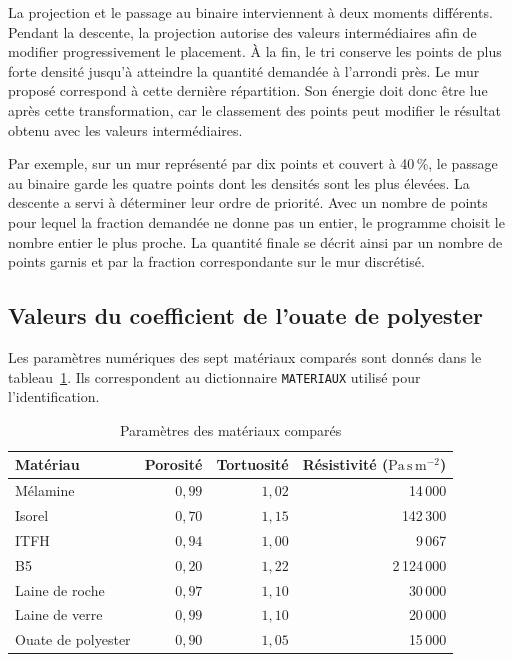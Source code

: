 \documentclass[11pt,a4paper]{article}
\newcommand{\code}[1]{\begingroup\def\UrlBreaks{\do\_\do\/\do\.}\nolinkurl{#1}\endgroup}
\begin{document}
La projection et le passage au binaire interviennent à deux moments différents. Pendant la descente, la projection autorise des valeurs intermédiaires afin de modifier progressivement le placement. À la fin, le tri conserve les points de plus forte densité jusqu'à atteindre la quantité demandée à l'arrondi près. Le mur proposé correspond à cette dernière répartition. Son énergie doit donc être lue après cette transformation, car le classement des points peut modifier le résultat obtenu avec les valeurs intermédiaires.

Par exemple, sur un mur représenté par dix points et couvert à 40\,\%, le passage au binaire garde les quatre points dont les densités sont les plus élevées. La descente a servi à déterminer leur ordre de priorité. Avec un nombre de points pour lequel la fraction demandée ne donne pas un entier, le programme choisit le nombre entier le plus proche. La quantité finale se décrit ainsi par un nombre de points garnis et par la fraction correspondante sur le mur discrétisé.

\subsection{Valeurs du coefficient de l'ouate de polyester}
\label{sec:alpha}
Les paramètres numériques des sept matériaux comparés sont donnés dans le tableau~\ref{tab:materiaux}. Ils correspondent au dictionnaire \code{MATERIAUX} utilisé pour l'identification.

\begin{table}[!htbp]
\centering
\small
\begin{tabular}{lrrr}
\toprule
Matériau & Porosité & Tortuosité & \shortstack{Résistivité\\($\mathrm{Pa\,s\,m^{-2}}$)}\\
\midrule
Mélamine & $0{,}99$ & $1{,}02$ & 14\,000\\
Isorel & $0{,}70$ & $1{,}15$ & 142\,300\\
ITFH & $0{,}94$ & $1{,}00$ & 9\,067\\
B5 & $0{,}20$ & $1{,}22$ & 2\,124\,000\\
Laine de roche & $0{,}97$ & $1{,}10$ & 30\,000\\
Laine de verre & $0{,}99$ & $1{,}10$ & 20\,000\\
Ouate de polyester & $0{,}90$ & $1{,}05$ & 15\,000\\
\bottomrule
\end{tabular}
\caption{Paramètres des matériaux comparés}
\label{tab:materiaux}
\end{table}
\end{document}
